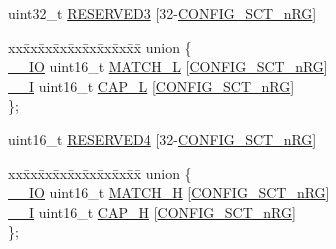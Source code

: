 \begin{DoxyCompactItemize}
\begin{tabbing}
\end{tabbing}\item 
uint32\+\_\+t \hyperlink{struct_l_p_c___s_c_t___t_a9e45447d2ebd831c7c0c5ef2d9428abf}{R\+E\+S\+E\+R\+V\+E\+D3} \mbox{[}32-\/\hyperlink{group___s_c_t__18_x_x__43_x_x_ga8d80e251208a01483a6b00c81ecb7493}{C\+O\+N\+F\+I\+G\+\_\+\+S\+C\+T\+\_\+n\+RG}\mbox{]}
\item 
\begin{tabbing}
xx\=xx\=xx\=xx\=xx\=xx\=xx\=xx\=xx\=\kill
union \{\\
\>\hyperlink{core__sc300_8h_aec43007d9998a0a0e01faede4133d6be}{\_\_IO} uint16\_t \hyperlink{struct_l_p_c___s_c_t___t_a181deddddb3e03ac728c0febecf09533}{MATCH\_L} \mbox{[}\hyperlink{group___s_c_t__18_x_x__43_x_x_ga8d80e251208a01483a6b00c81ecb7493}{CONFIG\_SCT\_nRG}\mbox{]}\\
\>\hyperlink{core__sc300_8h_af63697ed9952cc71e1225efe205f6cd3}{\_\_I} uint16\_t \hyperlink{struct_l_p_c___s_c_t___t_ac3c125811620bcdb8c1b0fe006042da5}{CAP\_L} \mbox{[}\hyperlink{group___s_c_t__18_x_x__43_x_x_ga8d80e251208a01483a6b00c81ecb7493}{CONFIG\_SCT\_nRG}\mbox{]}\\
\}; \\

\end{tabbing}\item 
uint16\+\_\+t \hyperlink{struct_l_p_c___s_c_t___t_affca949c40794389e0513a7bb1048344}{R\+E\+S\+E\+R\+V\+E\+D4} \mbox{[}32-\/\hyperlink{group___s_c_t__18_x_x__43_x_x_ga8d80e251208a01483a6b00c81ecb7493}{C\+O\+N\+F\+I\+G\+\_\+\+S\+C\+T\+\_\+n\+RG}\mbox{]}
\item 
\begin{tabbing}
xx\=xx\=xx\=xx\=xx\=xx\=xx\=xx\=xx\=\kill
union \{\\
\>\hyperlink{core__sc300_8h_aec43007d9998a0a0e01faede4133d6be}{\_\_IO} uint16\_t \hyperlink{struct_l_p_c___s_c_t___t_a5ad66fb76d1eb1fec0ed8d9af8e9120d}{MATCH\_H} \mbox{[}\hyperlink{group___s_c_t__18_x_x__43_x_x_ga8d80e251208a01483a6b00c81ecb7493}{CONFIG\_SCT\_nRG}\mbox{]}\\
\>\hyperlink{core__sc300_8h_af63697ed9952cc71e1225efe205f6cd3}{\_\_I} uint16\_t \hyperlink{struct_l_p_c___s_c_t___t_a931b5b9bd76910b7bdad946486aa7e13}{CAP\_H} \mbox{[}\hyperlink{group___s_c_t__18_x_x__43_x_x_ga8d80e251208a01483a6b00c81ecb7493}{CONFIG\_SCT\_nRG}\mbox{]}\\
\}; \\


\end{tabbing}
\end{DoxyCompactItemize}
